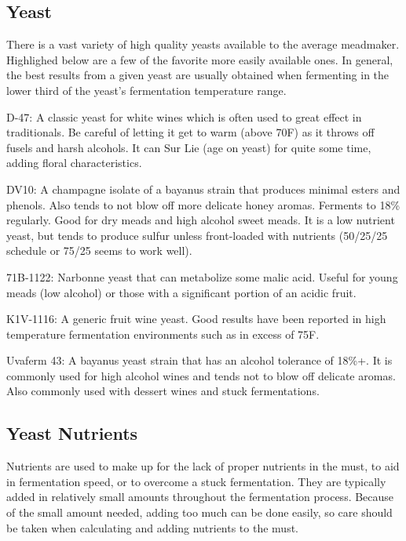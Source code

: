 \documentclass{article}
\begin{document}
 \subsection{Yeast}
  There is a vast variety of high quality yeasts available to the average meadmaker. Highlighed below are a few of the favorite more easily available ones.
  In general, the best results from a given yeast are usually obtained when fermenting in the lower third of the yeast's fermentation temperature range.

  D-47: A classic yeast for white wines which is often used to great effect in traditionals. Be careful of letting it get to warm (above 70\textdegree F) as it throws off fusels and harsh alcohols. It can Sur Lie (age on yeast) for quite some time, adding floral characteristics.

  DV10: A champagne isolate of a bayanus strain that produces minimal esters and phenols. Also tends to not blow off more delicate honey aromas. 
  Ferments to 18\% regularly. Good for dry meads and high alcohol sweet meads. It is a low nutrient yeast, but tends to produce sulfur unless 
  front-loaded with nutrients (50/25/25 schedule or 75/25 seems to work well).

  71B-1122: Narbonne yeast that can metabolize some malic acid. Useful for young meads (low alcohol) or those with a 
  significant portion of an acidic fruit.

  K1V-1116: A generic fruit wine yeast. Good results have been reported in high temperature fermentation environments such as in excess of 75\textdegree F.

  Uvaferm 43: A bayanus yeast strain that has an alcohol tolerance of 18\%+. It is commonly used for high alcohol wines and tends not to blow off 
  delicate aromas. Also commonly used with dessert wines and stuck fermentations. 

 \subsection{Yeast Nutrients}
  Nutrients are used to make up for the lack of proper nutrients in the must, to aid in fermentation speed, or to overcome a stuck fermentation. 
  They are typically added in relatively small amounts throughout the fermentation process. Because of the small amount needed, adding too 
  much can be done easily, so care should be taken when calculating and adding nutrients to the must.
\end{document}
